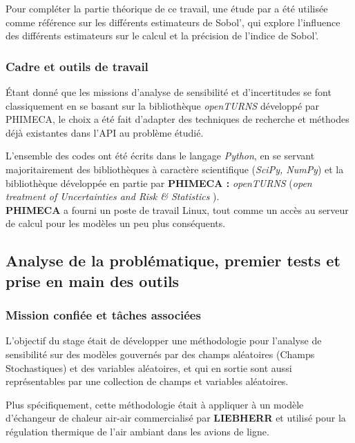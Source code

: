 \documentclass[a4paper,10pt]{article}
\begin{document}
Pour compléter la partie théorique de ce travail, une étude par \cite{dumas2017} a été utilisée comme référence sur les différents estimateurs de Sobol', qui explore l'influence des différents estimateurs sur le calcul et la précision de l'indice de Sobol'.  

\subsubsection{Cadre et outils de travail}
Étant donné que les missions d'analyse de sensibilité et d'incertitudes se font classiquement en se basant sur la bibliothèque \textit{openTURNS} développé par PHIMECA, le choix a été fait d'adapter des techniques de recherche et méthodes déjà existantes dans l'API au problème étudié.  \par \smallskip

L'ensemble des codes ont été écrits dans le langage \textit{Python}, en se servant majoritairement des bibliothèques à caractère scientifique (\textit{SciPy, NumPy}) et la bibliothèque développée en partie par \textbf{PHIMECA :} \textit{openTURNS} (\emph{open treatment of Uncertainties and Risk \& Statistics })\cite{OpenTURNS}.\\
\textbf{PHIMECA} a fourni un poste de travail Linux, tout comme un accès au serveur de calcul pour les modèles un peu plus conséquents. \\

\subsection{Analyse de la problématique, premier tests et prise en main des outils}

\subsubsection{Mission confiée et tâches associées}
L'objectif du stage était de développer une méthodologie pour l'analyse de sensibilité sur des modèles gouvernés par des champs aléatoires (Champs Stochastiques) et des variables aléatoires, et qui en sortie sont aussi représentables par une collection de champs et variables aléatoires. \par 

Plus spécifiquement, cette méthodologie était à appliquer à un modèle d'échangeur de chaleur air-air commercialisé par \textbf{LIEBHERR} et utilisé pour la régulation thermique de l'air ambiant dans les avions de ligne. \par \smallskip
\end{document}
